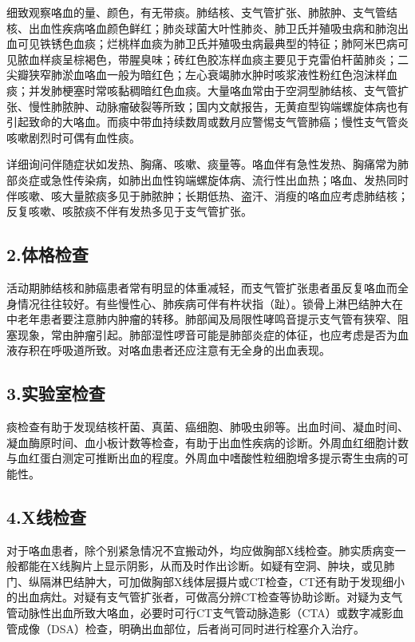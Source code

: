 细致观察咯血的量、颜色，有无带痰。肺结核、支气管扩张、肺脓肿、支气管结核、出血性疾病咯血颜色鲜红；肺炎球菌大叶性肺炎、肺卫氏并殖吸虫病和肺泡出血可见铁锈色血痰；烂桃样血痰为肺卫氏并殖吸虫病最典型的特征；肺阿米巴病可见脓血样痰呈棕褐色，带腥臭味；砖红色胶冻样血痰主要见于克雷伯杆菌肺炎；二尖瓣狭窄肺淤血咯血一般为暗红色；左心衰竭肺水肿时咳浆液性粉红色泡沫样血痰；并发肺梗塞时常咳黏稠暗红色血痰。大量咯血常由于空洞型肺结核、支气管扩张、慢性肺脓肿、动脉瘤破裂等所致；国内文献报告，无黄疸型钩端螺旋体病也有引起致命的大咯血。而痰中带血持续数周或数月应警惕支气管肺癌；慢性支气管炎咳嗽剧烈时可偶有血性痰。

详细询问伴随症状如发热、胸痛、咳嗽、痰量等。咯血伴有急性发热、胸痛常为肺部炎症或急性传染病，如肺出血性钩端螺旋体病、流行性出血热；咯血、发热同时伴咳嗽、咳大量脓痰多见于肺脓肿；长期低热、盗汗、消瘦的咯血应考虑肺结核；反复咳嗽、咳脓痰不伴有发热多见于支气管扩张。

\subsection{2.体格检查}

活动期肺结核和肺癌患者常有明显的体重减轻，而支气管扩张患者虽反复咯血而全身情况往往较好。有些慢性心、肺疾病可伴有杵状指（趾）。锁骨上淋巴结肿大在中老年患者要注意肺内肿瘤的转移。肺部闻及局限性哮鸣音提示支气管有狭窄、阻塞现象，常由肿瘤引起。肺部湿性啰音可能是肺部炎症的体征，也应考虑是否为血液存积在呼吸道所致。对咯血患者还应注意有无全身的出血表现。

\subsection{3.实验室检查}

痰检查有助于发现结核杆菌、真菌、癌细胞、肺吸虫卵等。出血时间、凝血时间、凝血酶原时间、血小板计数等检查，有助于出血性疾病的诊断。外周血红细胞计数与血红蛋白测定可推断出血的程度。外周血中嗜酸性粒细胞增多提示寄生虫病的可能性。

\subsection{4.X线检查}

对于咯血患者，除个别紧急情况不宜搬动外，均应做胸部X线检查。肺实质病变一般都能在X线胸片上显示阴影，从而及时作出诊断。如疑有空洞、肿块，或见肺门、纵隔淋巴结肿大，可加做胸部X线体层摄片或CT检查，CT还有助于发现细小的出血病灶。对疑有支气管扩张者，可做高分辨CT检查等协助诊断。对疑为支气管动脉性出血所致大咯血，必要时可行CT支气管动脉造影（CTA）或数字减影血管成像（DSA）检查，明确出血部位，后者尚可同时进行栓塞介入治疗。

